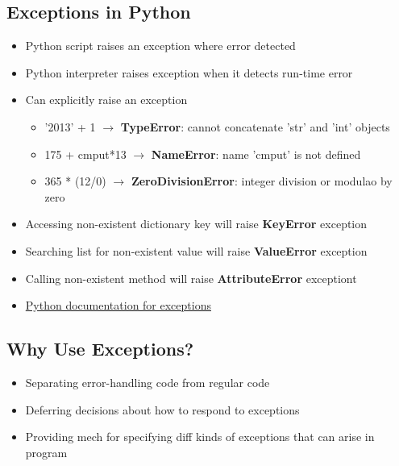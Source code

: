 \documentclass{article}
\begin{document}
\subsection{Exceptions in Python}
    \begin{multicols}{2}
        \begin{itemize}
            \item Python script raises an exception where error detected
            \item Python interpreter raises exception when it detects run-time error
            \item Can explicitly raise an exception
                \begin{itemize}
                    \item '2013' + 1 $\rightarrow$ \textbf{TypeError}: cannot concatenate 'str' and 'int' objects
                    \item 175 + cmput*13 $\rightarrow$ \textbf{NameError}: name 'cmput' is not defined
                    \item 365 * (12/0) $\rightarrow$ \textbf{ZeroDivisionError}: integer division or modulao by zero
                \end{itemize}
            \item Accessing non-existent dictionary key will raise \textbf{KeyError} exception
            \item Searching list for non-existent value will raise \textbf{ValueError} exception
            \item Calling non-existent method will raise \textbf{AttributeError} exceptiont
            \item \href{https://docs.python.org/3/library/exceptions.html}{Python documentation for exceptions}
        \end{itemize}
    \end{multicols}

\subsection{Why Use Exceptions?}
    \begin{itemize}
        \item Separating error-handling code from regular code
        \item Deferring decisions about how to respond to exceptions
        \item Providing mech for specifying diff kinds of exceptions that can arise in program
    \end{itemize}
\end{document}
